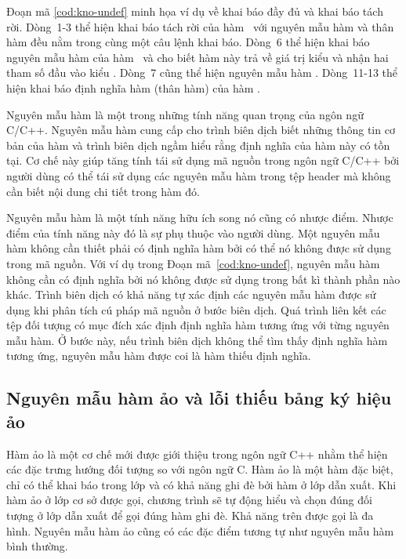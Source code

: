 Đoạn mã \ref{cod:kno-undef} minh họa ví dụ về khai báo đầy đủ và khai báo tách rời. Dòng~1-3 thể hiện khai báo tách rời của hàm~ với nguyên mẫu hàm và thân hàm đều nằm trong cùng một câu lệnh khai báo. Dòng~6 thể hiện khai báo nguyên mẫu hàm của hàm~ và cho biết hàm này trả về giá trị kiểu  và nhận hai tham số đầu vào kiểu . Dòng~7 cũng thể hiện nguyên mẫu hàm . Dòng~11-13 thể hiện khai báo định nghĩa hàm (thân hàm) của hàm .

Nguyên mẫu hàm là một trong những tính năng quan trọng của ngôn ngữ C/C++. Nguyên mẫu hàm cung cấp cho trình biên dịch biết những thông tin cơ bản của hàm và trình biên dịch ngầm hiểu rằng định nghĩa của hàm này có tồn tại. Cơ chế này giúp tăng tính tái sử dụng mã nguồn trong ngôn ngữ C/C++ bởi người dùng có thể tái sử dụng các nguyên mẫu hàm trong tệp header mà không cần biết nội dung chi tiết trong hàm đó.

Nguyên mẫu hàm là một tính năng hữu ích song nó cũng có nhược điểm. Nhược điểm của tính năng này đó là sự phụ thuộc vào người dùng. Một nguyên mẫu hàm không cần thiết phải có định nghĩa hàm bởi có thể nó không được sử dụng trong mã nguồn. Với ví dụ trong Đoạn mã~\ref{cod:kno-undef}, nguyên mẫu hàm  không cần có định nghĩa bởi nó không được sử dụng trong bất kì thành phần nào khác. Trình biên dịch có khả năng tự xác định các nguyên mẫu hàm được sử dụng khi phân tích cú pháp mã nguồn ở bước biên dịch. Quá trình liên kết các tệp đối tượng có mục đích xác định định nghĩa hàm tương ứng với từng nguyên mẫu hàm. Ở bước này, nếu trình biên dịch không thể tìm thấy định nghĩa hàm tương ứng, nguyên mẫu hàm được coi là hàm thiếu định nghĩa.
\subsection{Nguyên mẫu hàm ảo và lỗi thiếu bảng ký hiệu ảo}
Hàm ảo là một cơ chế mới được giới thiệu trong ngôn ngữ C++ nhằm thể hiện các đặc trưng hướng đối tượng so với ngôn ngữ C. Hàm ảo là một hàm đặc biệt, chỉ có thể khai báo trong lớp và có khả năng ghi đè bởi hàm ở lớp dẫn xuất. Khi hàm ảo ở lớp cơ sở được gọi, chương trình sẽ tự động hiểu và chọn đúng đối tượng ở lớp dẫn xuất để gọi đúng hàm ghi đè. Khả năng trên được gọi là đa hình. Nguyên mẫu hàm ảo cũng có các đặc điểm tương tự như nguyên mẫu hàm bình thường.

